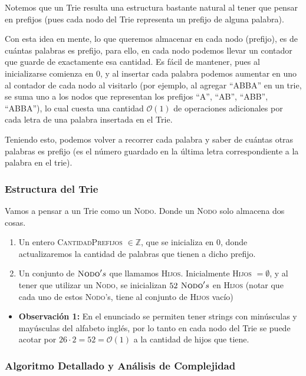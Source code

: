 	 Notemos que un Trie resulta una estructura bastante natural al tener que pensar en prefijos (pues cada nodo del Trie representa un prefijo de alguna palabra). 
	
	Con esta idea en mente, lo que queremos almacenar en cada nodo (prefijo), es de cuántas palabras es prefijo, para ello, en cada nodo podemos llevar un contador que guarde de exactamente esa cantidad. Es fácil de mantener, pues al inicializarse comienza en $0$, y al insertar cada palabra podemos aumentar en uno al contador de cada nodo al visitarlo (por ejemplo, al agregar ``ABBA'' en un trie, se suma uno a los nodos que representan los prefijos ``A'', ``AB'', ``ABB'', ``ABBA''), lo cual cuesta una cantidad $\mathcal{O}(1)$ de operaciones adicionales por cada letra de una palabra insertada en el Trie.
	
	Teniendo esto, podemos volver a recorrer cada palabra y saber de cuántas otras palabras es prefijo (es el número guardado en la última letra correspondiente a la palabra en el trie).
	
\subsubsection{Estructura del Trie}

Vamos a pensar a un Trie como un \textsc{Nodo}. Donde un \textsc{Nodo} solo almacena dos cosas.
\begin{enumerate}
	\item Un entero \textsc{CantidadPrefijos} $\in \mathbb{Z}$, que se inicializa en $0$, donde actualizaremos la cantidad de palabras que tienen a dicho prefijo.
	\item Un conjunto de $\textsc{Nodo}'s$ que llamamos \textsc{Hijos}. Inicialmente \textsc{Hijos} $ = \emptyset$, y al tener que utilizar un \textsc{Nodo}, se inicializan $ 52 \textsc{ Nodo}'s$ en \textsc{Hijos} (notar que cada uno de estos \textsc{Nodo}'s, tiene al conjunto de \textsc{Hijos} vacío)
\end{enumerate}


\begin{itemize}
		\item \textbf{Observación 1:} En el enunciado se permiten tener strings con minúsculas y mayúsculas del alfabeto inglés, por lo tanto en cada nodo del Trie se puede acotar por $26 \cdot 2 = 52 = \mathcal{O}(1)$ a la cantidad de hijos que tiene.
\end{itemize}

\subsubsection{Algoritmo Detallado y Análisis de Complejidad }
	
